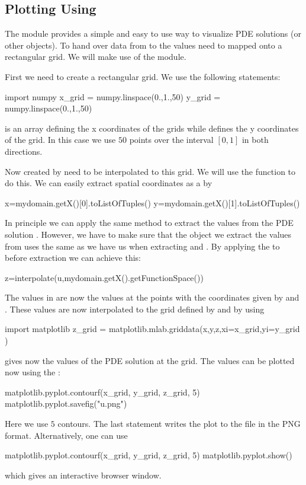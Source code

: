 \subsection{Plotting Using \MATPLOTLIB}
The \MATPLOTLIB module provides a simple and easy to use way to visualize PDE solutions (or other \Data objects). 
To hand over data from \escript to \MATPLOTLIB the values need to mapped onto a rectangular grid. We will make use 
of the \numpy module.

First we need to create a rectangular grid. We use the following statements:
\begin{python}
import numpy
x_grid = numpy.linspace(0.,1.,50)
y_grid = numpy.linspace(0.,1.,50)
\end{python}
 is an array defining the x coordinates of the grids while 
 defines the y coordinates of the grid. In this case we use $50$ points over the interval $[0,1]$
in both directions. 

Now created by \escript need to be interpolated to this grid. We will use the \MATPLOTLIB
{} function to do this. We can easily extract spatial coordinates as a  by
\begin{python}
x=mydomain.getX()[0].toListOfTuples()
y=mydomain.getX()[1].toListOfTuples()
\end{python}
In principle we can apply the same  method to extract the values from the 
PDE solution . However, we have to make sure that the \Data object we extract the values from 
uses the same \FunctionSpace as we have us when extracting  and . By applying the 
 to  before extraction we can achieve this:
\begin{python}
z=interpolate(u,mydomain.getX().getFunctionSpace())
\end{python}
The values in  are now the values at the points with the coordinates given by  and . These 
values are now interpolated to the grid defined by  and  by using
\begin{python}
import matplotlib
z_grid = matplotlib.mlab.griddata(x,y,z,xi=x_grid,yi=y_grid )
\end{python}
 gives now the values of the PDE solution  at the grid. The values can be plotted now
using the :
\begin{python}
matplotlib.pyplot.contourf(x_grid, y_grid, z_grid, 5)
matplotlib.pyplot.savefig("u.png")
\end{python}
Here we use $5$ contours. The last statement writes the plot to the file  in the PNG format. Alternatively, one can use 
\begin{python}
matplotlib.pyplot.contourf(x_grid, y_grid, z_grid, 5)
matplotlib.pyplot.show()
\end{python}
which gives an interactive browser window.


